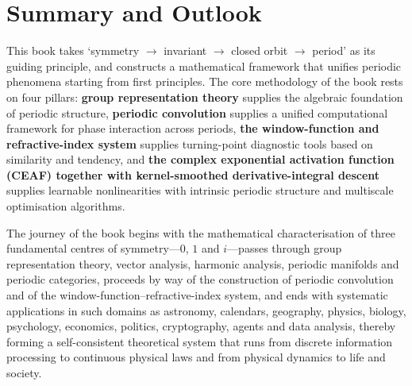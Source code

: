 \chapter{Summary and Outlook}

This book takes `symmetry $\to$ invariant $\to$ closed orbit $\to$ period' as its guiding principle, and constructs a mathematical framework that unifies periodic phenomena starting from first principles. The core methodology of the book rests on four pillars: \textbf{group representation theory} supplies the algebraic foundation of periodic structure, \textbf{periodic convolution} supplies a unified computational framework for phase interaction across periods, \textbf{the window-function and refractive-index system} supplies turning-point diagnostic tools based on similarity and tendency, and \textbf{the complex exponential activation function (CEAF) together with kernel-smoothed derivative-integral descent} supplies learnable nonlinearities with intrinsic periodic structure and multiscale optimisation algorithms.

The journey of the book begins with the mathematical characterisation of three fundamental centres of symmetry---$0$, $1$ and $i$---passes through group representation theory, vector analysis, harmonic analysis, periodic manifolds and periodic categories, proceeds by way of the construction of periodic convolution and of the window-function--refractive-index system, and ends with systematic applications in such domains as astronomy, calendars, geography, physics, biology, psychology, economics, politics, cryptography, agents and data analysis, thereby forming a self-consistent theoretical system that runs from discrete information processing to continuous physical laws and from physical dynamics to life and society.


